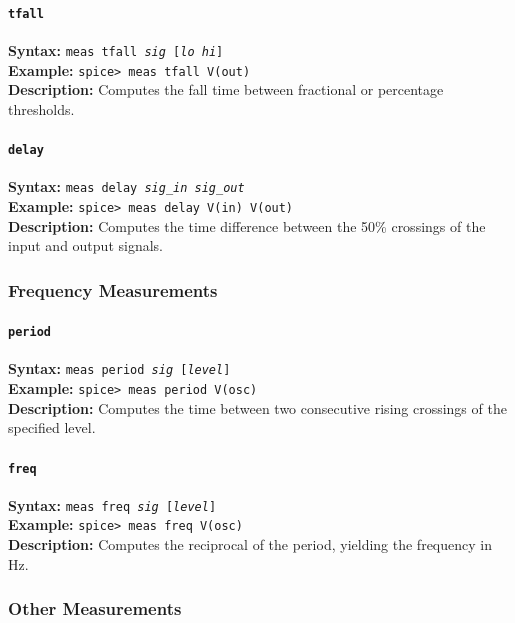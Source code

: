 \paragraph{\texttt{tfall}}
\textbf{Syntax:} \texttt{meas tfall \textit{sig} [\textit{lo} \textit{hi}]}\\
\textbf{Example:} \texttt{spice> meas tfall V(out)}\\
\textbf{Description:} Computes the fall time between fractional or percentage thresholds.

\paragraph{\texttt{delay}}
\textbf{Syntax:} \texttt{meas delay \textit{sig\_in} \textit{sig\_out}}\\
\textbf{Example:} \texttt{spice> meas delay V(in) V(out)}\\
\textbf{Description:} Computes the time difference between the 50\% crossings of the input and output signals.

\subsubsection{Frequency Measurements}

\paragraph{\texttt{period}}
\textbf{Syntax:} \texttt{meas period \textit{sig} [\textit{level}]}\\
\textbf{Example:} \texttt{spice> meas period V(osc)}\\
\textbf{Description:} Computes the time between two consecutive rising crossings of the specified level.

\paragraph{\texttt{freq}}
\textbf{Syntax:} \texttt{meas freq \textit{sig} [\textit{level}]}\\
\textbf{Example:} \texttt{spice> meas freq V(osc)}\\
\textbf{Description:} Computes the reciprocal of the period, yielding the frequency in \si{\hertz}.

\subsubsection{Other Measurements}

